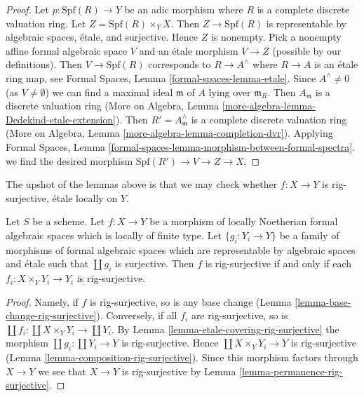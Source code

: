 \begin{proof}
Let $p : \text{Spf}(R) \to Y$ be an adic morphism where $R$ is a complete
discrete valuation ring. Let $Z = \text{Spf}(R) \times_Y X$. Then
$Z \to \text{Spf}(R)$ is representable by algebraic spaces, \'etale, and
surjective. Hence $Z$ is nonempty. Pick a nonempty affine formal algebraic
space $V$ and an \'etale morphism $V \to Z$ (possible by our definitions).
Then $V \to \text{Spf}(R)$ corresponds to $R \to A^\wedge$ where
$R \to A$ is an \'etale ring map, see Formal Spaces, Lemma
\ref{formal-spaces-lemma-etale}. Since $A^\wedge \not = 0$
(as $V \not = \emptyset$) we can find a maximal ideal $\mathfrak m$
of $A$ lying over $\mathfrak m_R$. Then $A_\mathfrak m$ is a discrete
valuation ring (More on Algebra, Lemma
\ref{more-algebra-lemma-Dedekind-etale-extension}).
Then $R' = A_\mathfrak m^\wedge$ is a complete discrete valuation ring
(More on Algebra, Lemma \ref{more-algebra-lemma-completion-dvr}).
Applying Formal Spaces, Lemma
\ref{formal-spaces-lemma-morphism-between-formal-spectra}.
we find the desired morphism $\text{Spf}(R') \to V \to Z \to X$.
\end{proof}

\noindent
The upshot of the lemmas above is that we may check whether
$f : X \to Y$ is rig-surjective, \'etale locally on $Y$.

\begin{lemma}
\label{lemma-upshot}
Let $S$ be a scheme. Let $f : X \to Y$ be a morphism of locally
Noetherian formal algebraic spaces which is locally of finite type.
Let $\{g_i : Y_i \to Y\}$ be a family of morphisms of formal
algebraic spaces which are representable by algebraic spaces and
\'etale such that $\coprod g_i$ is surjective.
Then $f$ is rig-surjective if and only if each
$f_i : X \times_Y Y_i \to Y_i$ is rig-surjective.
\end{lemma}

\begin{proof}
Namely, if $f$ is rig-surjective, so is any base change
(Lemma \ref{lemma-base-change-rig-surjective}).
Conversely, if all $f_i$ are rig-surjective, so is
$\coprod f_i : \coprod X \times_Y Y_i \to \coprod Y_i$.
By Lemma \ref{lemma-etale-covering-rig-surjective}
the morphism $\coprod g_i : \coprod Y_i \to Y$ is rig-surjective.
Hence $\coprod X \times_Y Y_i \to Y$ is rig-surjective
(Lemma \ref{lemma-composition-rig-surjective}).
Since this morphism factors through $X \to Y$ we see that $X \to Y$
is rig-surjective by Lemma \ref{lemma-permanence-rig-surjective}.
\end{proof}

